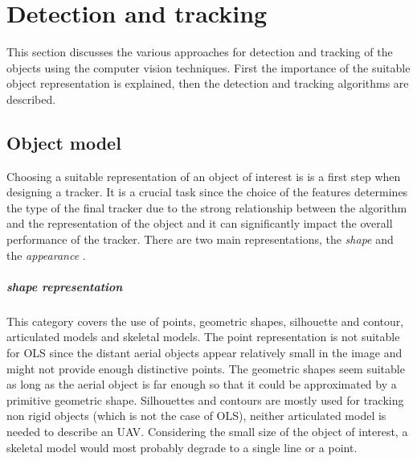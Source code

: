 \chapter{Detection and tracking} \label{txt:detection_and_tracking}

This section discusses the various approaches for detection and tracking of the objects using the computer vision techniques. First the importance of the suitable object representation is explained, then the detection and tracking algorithms are described.

\section{Object model}

Choosing a suitable representation of an object of interest is is a first step when designing a tracker. It is a crucial task since the choice of the features determines the type of the final tracker due to the strong relationship between the algorithm and the representation of the object and it can significantly impact the overall performance of the tracker. There are two main representations, the \textit{shape} and the \textit{appearance} \cite{Yilmaz:2006:OTS:1177352.1177355}.

\paragraph{shape representation} 
This category covers the use of points, geometric shapes, silhouette and contour, articulated models and skeletal models. The point representation is not suitable for OLS since the distant aerial objects appear relatively small in the image and might not provide enough distinctive points. The geometric shapes seem suitable as long as the aerial object is far enough so that it could be approximated by a primitive geometric shape. Silhouettes and contours are mostly used for tracking non rigid objects (which is not the case of OLS), neither articulated model is needed to describe an UAV. Considering the small size of the object of interest, a skeletal model would most probably degrade to a single line or a point.

